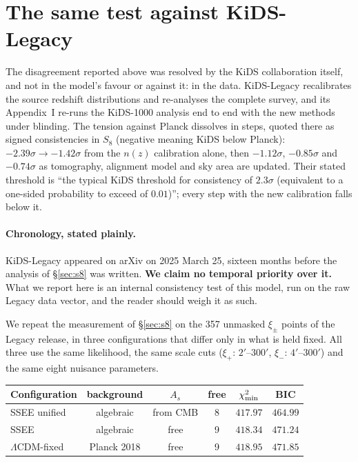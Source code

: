 \documentclass[12pt,a4paper]{article}
\newcommand{\SSEE}{\textsc{SSEE}}
\begin{document}
\section{The same test against KiDS-Legacy}
\label{sec:legacy}

The disagreement reported above was resolved by the KiDS collaboration itself,
and not in the model's favour or against it: in the data. KiDS-Legacy
\citep{Wright2025} recalibrates the source redshift distributions and re-analyses
the complete survey, and its Appendix~I re-runs the KiDS-1000 analysis end to
end with the new methods under blinding. The tension against Planck dissolves in
steps, quoted there as signed consistencies in $S_8$ (negative meaning KiDS
below Planck): $-2.39\sigma \to -1.42\sigma$ from the $n(z)$ calibration
alone, then $-1.12\sigma$, $-0.85\sigma$ and $-0.74\sigma$ as tomography,
alignment model and sky area are updated. Their stated threshold is
``the typical KiDS threshold for consistency of $2.3\sigma$ (equivalent to a
one-sided probability to exceed of $0.01$)''; every step with the new
calibration falls below it.

\paragraph{Chronology, stated plainly.} KiDS-Legacy appeared on arXiv on
2025 March 25, sixteen months before the analysis of \S\ref{sec:s8} was written.
\textbf{We claim no temporal priority over it.} What we report here is an
internal consistency test of this model, run on the raw Legacy data vector, and
the reader should weigh it as such.

We repeat the measurement of \S\ref{sec:s8} on the 357 unmasked $\xi_\pm$ points
of the Legacy release, in three configurations that differ only in what is held
fixed. All three use the same likelihood, the same scale cuts
($\xi_+$: $2'$--$300'$, $\xi_-$: $4'$--$300'$) and the same eight nuisance
parameters.

\begin{center}
\footnotesize
\begin{tabular}{lccccc}
\toprule
Configuration & background & $A_s$ & free & $\chi^2_{\rm min}$ & BIC \\
\midrule
\SSEE{} unified & algebraic & from CMB & 8 & $417.97$ & $464.99$ \\
\SSEE{}         & algebraic & free     & 9 & $418.34$ & $471.24$ \\
$\Lambda$CDM-fixed & Planck 2018 & free & 9 & $418.95$ & $471.85$ \\
\bottomrule
\end{tabular}
\normalsize
\end{center}
\end{document}
